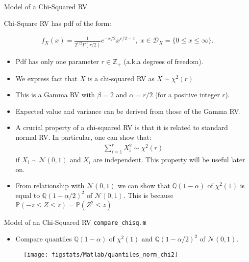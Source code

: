 \documentclass[handout,9pt]{beamer}
\begin{document}
%
\begin{frame}{Model of a Chi-Squared RV}

Chi-Square RV has pdf of the form:
\begin{block}{}
\begin{align*}
f_X(x)=\frac{1}{2^{r/2}\Gamma(r/2)}e^{-x/2}x^{r/2-1},\; x\in \mathcal{D}_X=\{0\leq x\leq \infty\}.
\end{align*}
\end{block}
\begin{itemize}
\setlength{\itemsep}{5pt}
\item Pdf has only one parameter $r\in \mathbb{Z}_+$ (a.k.a degrees of freedom).
\item We express fact that $X$ is a chi-squared RV as $X\sim \chi^2(r)$
\item This is a Gamma RV with $\beta=2$ and $\alpha=r/2$ (for a positive integer $r$). 
\item Expected value and variance can be derived from those of the Gamma RV.  
\item A crucial property of a chi-squared RV is that it is related to standard normal RV. In particular, one can show that: 
\begin{align*}
\sum_{i=1}^rX_i^2\sim \chi^2(r)
\end{align*}
if $X_i\sim \mathcal{N}(0,1)$ and $X_i$ are independent. This property will be useful later on. 
\item From relationship with $\mathcal{N}(0,1)$ we can show that $\mathbb{Q}(1-\alpha)$ of $\chi^2(1)$ is equal to $\mathbb{Q}(1-\alpha/2)^2$ of $\mathcal{N}(0,1)$. This is because $\mathbb{P}(-z\leq Z\leq z)=\mathbb{P}(Z^2\leq z)$.  
\end{itemize}

\end{frame}

%
\begin{frame}{Model of an Chi-Squared RV \footnotesize{\texttt{compare\_chisq.m}}}
\begin{itemize}
\item Compare quantiles $\mathbb{Q}(1-\alpha)$ of $\chi^2(1)$ and $\mathbb{Q}(1-\alpha/2)^2$ of $\mathcal{N}(0,1)$.
\end{itemize}
\begin{figure}[!htb]
    \centering
	\texttt{[image: figstats/Matlab/quantiles\_norm\_chi2]}
\end{figure}

\end{frame}
\end{document}
